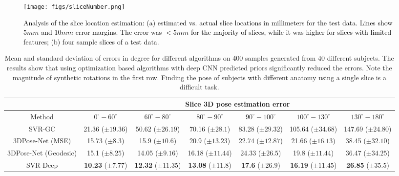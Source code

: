 \documentclass[journal,transmag]{IEEEtran}
\begin{document}

\begin{figure}
    \centering
    \texttt{[image: figs/sliceNumber.png]}
    \caption{\textcolor{black}{Analysis of the slice location estimation: (a) estimated vs. actual slice locations in millimeters for the test data. Lines show $5mm$ and $10mm$ error margins. The error was $<5mm$ for the majority of slices, while it was higher for slices with limited features; (b) four sample slices of a test data.}}
    \label{fig:Slice}
\end{figure}

\begin{table*}[h!]
\small
\centering
 \begin{tabular}{|c||c|c|c|c|c|c|} 
 \hline
  &  \multicolumn{6}{c|}{Slice 3D pose estimation error} \\
 \hline
Method & $0^{\circ} - 60^{\circ}$  & $60^{\circ} - 80^{\circ}$ & $80^{\circ} - 90^{\circ}$ & $90^{\circ} - 100^{\circ}$ & $100^{\circ} - 130^{\circ}$ & $130^{\circ} - 180^{\circ}$ \\
 \hline
SVR-GC & 21.36 ($\pm19.36$) & 50.62 ($\pm26.19$) & 70.16 ($\pm28.1$)& 83.28 ($\pm29.32$) & 105.64 ($\pm34.68$) & 147.69 ($\pm24.80$) \\ 
 \hline
 \color{black}
3DPose-Net (MSE) & 15.73 ($\pm8.3$) & 15.9 ($\pm10.6$) & 20.9 ($\pm13.23$)& 22.74 ($\pm12.87$) & 21.66 ($\pm16.13$) & 38.45 ($\pm32.10$) \color{black} \\ 
 
 \hline
3DPose-Net (Geodesic) & 15.1 ($\pm8.25$) & 14.05 ($\pm9.16$) & 16.18 ($\pm11.44$)& 24.33 ($\pm26.5$) & 19.8 ($\pm11.44$) & 36.47 ($\pm34.25$) \\ 
 \hline
SVR-Deep & \textbf{10.23} ($\pm7.77$) & \textbf{12.32} ($\pm11.35$) & \textbf{13.08} ($\pm11.8$)& \textbf{17.6} ($\pm26.9$) & \textbf{16.19} ($\pm11.45$) & \textbf{26.85} ($\pm35.5$) \\ 
 \hline
\end{tabular}
\caption{Mean and standard deviation of errors in degree for different algorithms on 400 samples generated from 40 different subjects. The results show that using optimization based algorithms with deep CNN predicted priors significantly reduced the errors. Note the magnitude of synthetic rotations in the first row. Finding the pose of subjects with different anatomy using a single slice is a difficult task.}
\label{table:S2V}
\end{table*}
\end{document}
